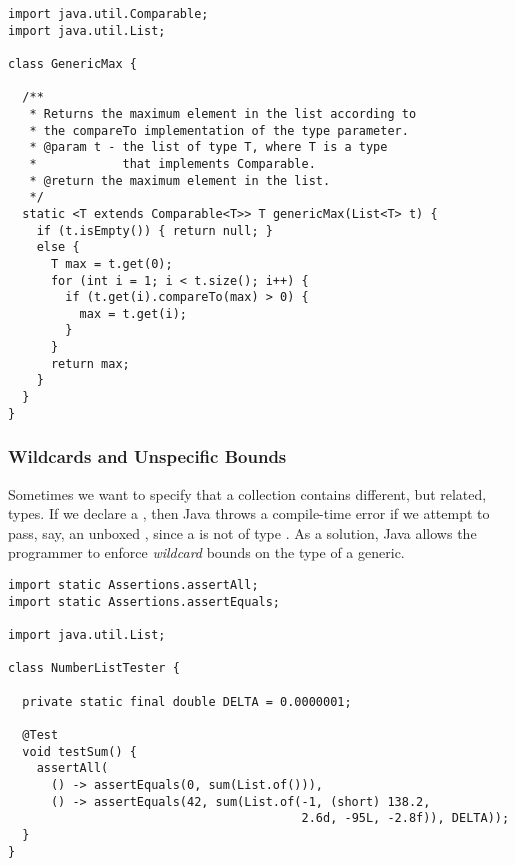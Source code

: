 \begin{lstlisting}[language=MyJava]
import java.util.Comparable;
import java.util.List;

class GenericMax {
  
  /**
   * Returns the maximum element in the list according to 
   * the compareTo implementation of the type parameter.
   * @param t - the list of type T, where T is a type 
   *            that implements Comparable.
   * @return the maximum element in the list.
   */
  static <T extends Comparable<T>> T genericMax(List<T> t) {
    if (t.isEmpty()) { return null; }
    else {
      T max = t.get(0);
      for (int i = 1; i < t.size(); i++) {
        if (t.get(i).compareTo(max) > 0) { 
          max = t.get(i); 
        }
      }
      return max;
    }
  }
}
\end{lstlisting}

\subsubsection*{Wildcards and Unspecific Bounds}
Sometimes we want to specify that a collection contains different, but related, types. If we declare a , then Java throws a compile-time error if we attempt to pass, say, an unboxed , since a  is not of type . As a solution, Java allows the programmer to enforce \emph{wildcard} bounds on the type of a generic. 


\begin{lstlisting}[language=MyJava]
import static Assertions.assertAll;
import static Assertions.assertEquals;

import java.util.List;

class NumberListTester {

  private static final double DELTA = 0.0000001;

  @Test
  void testSum() {
    assertAll(
      () -> assertEquals(0, sum(List.of())),
      () -> assertEquals(42, sum(List.of(-1, (short) 138.2, 
                                         2.6d, -95L, -2.8f)), DELTA));
  }
}
\end{lstlisting}

